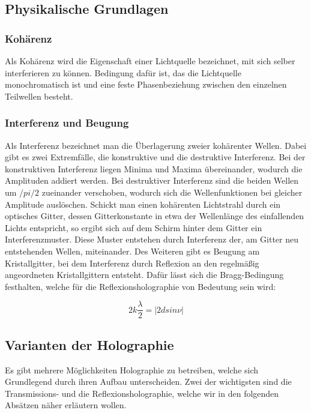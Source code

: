 \documentclass[12pt,a4paper]{article}
\begin{document}
\subsection{Physikalische Grundlagen}

\subsubsection{Kohärenz}

Als Kohärenz wird die Eigenschaft einer Lichtquelle bezeichnet, mit sich selber interferieren zu können. Bedingung dafür ist, das die Lichtquelle monochromatisch ist und eine feste Phasenbeziehung zwischen den einzelnen Teilwellen besteht.

\subsubsection{Interferenz und Beugung}

Als Interferenz bezeichnet man die Überlagerung zweier kohärenter Wellen. Dabei gibt es zwei Extremfälle, die konstruktive und die destruktive Interferenz. Bei der konstruktiven Interferenz liegen Minima und Maxima übereinander, wodurch die Amplituden addiert werden. Bei destruktiver Interferenz sind die beiden Wellen um $/pi /2$ zueinander verschoben, wodurch sich die Wellenfunktionen bei gleicher Amplitude auslöschen. Schickt man einen kohärenten Lichtstrahl durch ein optisches Gitter, dessen Gitterkonstante in etwa der Wellenlänge des einfallenden Lichts entspricht, so ergibt sich auf dem Schirm hinter dem Gitter ein Interferenzmuster. Diese Muster entstehen durch Interferenz der, am Gitter neu entstehenden Wellen, miteinander. Des Weiteren gibt es Beugung am Kristallgitter, bei dem Interferenz durch Reflexion an den regelmäßig angeordneten Kristallgittern entsteht. Dafür lässt sich die Bragg-Bedingung festhalten, welche für die Reflexionsholographie von Bedeutung sein wird:

\begin{equation}
2k \frac{\lambda}{2} = |2d sin \nu|
\label {1}
\end{equation}
	
\subsection{Varianten der Holographie}

Es gibt mehrere Möglichkeiten Holographie zu betreiben, welche sich Grundlegend durch ihren Aufbau unterscheiden. Zwei der wichtigsten sind die Transmissions- und die Reflexionsholographie, welche wir in den folgenden Absätzen näher erläutern wollen. 
\end{document}
